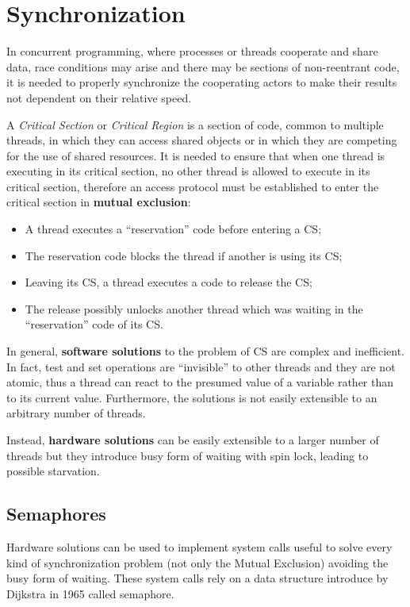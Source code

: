 \chapter{Synchronization}
In concurrent programming, where processes or threads cooperate and share data, race conditions may arise and there may be sections of non-reentrant code, it is needed to properly synchronize the cooperating actors to make their results not dependent on their relative speed.

A \emph{Critical Section} or \emph{Critical Region} is a section of code, common to multiple threads, in which they can access shared objects or in which they are competing for the use of shared resources. It is needed to ensure that when one thread is executing in its critical section, no other thread is allowed to execute in its critical section, therefore an access protocol must be established to enter the critical section in \textbf{mutual exclusion}:

\begin{itemize}
\item A thread executes a ``reservation'' code before entering a CS;
\item The reservation code blocks the thread if another is using its CS;
\item Leaving its CS, a thread executes a code to release the CS;
\item The release possibly unlocks another thread which was waiting in the ``reservation'' code of its CS.
\end{itemize}

In general, \textbf{software solutions} to the problem of CS are complex and inefficient. In fact, test and set operations are ``invisible'' to other threads and they are not atomic, thus a thread can react to the presumed value of a variable rather than to its current value. Furthermore, the solutions is not easily extensible to an arbitrary number of threads.

Instead, \textbf{hardware solutions} can be easily extensible to a larger number of threads but they introduce busy form of waiting with spin lock, leading to possible starvation.

\section{Semaphores}
Hardware solutions can be used to implement system calls useful to solve every kind of synchronization problem (not only the Mutual Exclusion) avoiding the busy form of waiting. These system calls rely on a data structure introduce by Dijkstra in 1965 called semaphore.

